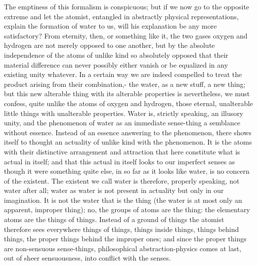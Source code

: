 \documentclass[12pt,a4paper]{book}
\begin{document}
The emptiness of this formalism is conspicuous; but if we now go to the
opposite extreme and let the atomist, entangled in abstractly physical
representations, explain the formation of water to us, will his explanation be
any more satisfactory? From eternity, then, or something like it, the two gases
oxygen and hydrogen are not merely opposed to one another, but by the absolute
independence of the atoms of unlike kind so absolutely opposed that their
material difference can never possibly either vanish or be equalized in any
existing unity whatever. In a certain way we are indeed
compelled to treat the product arising from their combination,- the water, as a
new stuff, a new thing; but this new alterable thing with its alterable
properties is nevertheless, we must confess, quite unlike the atoms of oxygen
and hydrogen, those eternal, unalterable little things with unalterable
properties. Water is, strictly speaking, an illusory unity, and the phenomenon
of water as an immediate sense-thing a semblance without essence. Instead of an
essence answering to the phenomenon, there shows itself to thought an actuality
of unlike kind with the phenomenon. It is the atoms with their distinctive
arrangement and attraction that here constitute what is actual in itself; and
that this actual in itself looks to our imperfect senses as though it were
something quite else, in so far as it looks like water, is no concern of the
existent. The existent we call water is therefore, properly speaking, not water
after all; water as water is not present in actuality but only in our
imagination. It is not the water that is the thing (the water is at most only
an apparent, improper thing); no, the groups of atoms are the thing: the
elementary atoms are the things of things. Instead of a ground of things the
atomist therefore sees everywhere things of things, things inside things,
things behind things, the proper things behind the improper ones; and since the
proper things are non-sensuous sense-things, philosophical abstraction-physics
comes at last, out of sheer sensuousness, into conflict with the senses.
\end{document}
